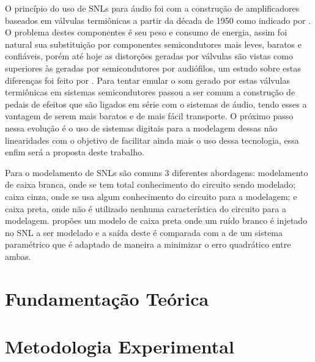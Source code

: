 O princípio do uso de SNLs para áudio foi com a construção de amplificadores baseados em válvulas termiônicas a partir da década de 1950 como indicado por . O problema destes componentes é seu peso e consumo de energia, assim foi natural sua substituição por componentes semicondutores mais leves, baratos e confiáveis, porém até hoje as distorções geradas por válvulas são vistas como superiores às geradas por semicondutores por audiófilos, um estudo sobre estas diferenças foi feito por . Para tentar emular o som gerado por estas válvulas termiônicas em sistemas semicondutores passou a ser comum a construção de pedais de efeitos que são ligados em série com o sistemas de áudio, tendo esses a vantagem de serem mais baratos e de mais fácil transporte. O próximo passo nessa evolução é o uso de sistemas digitais para a modelagem dessas não linearidades com o objetivo de facilitar ainda mais o uso dessa tecnologia, essa enfim será a proposta deste trabalho.

Para o modelamento de SNLs são comuns 3 diferentes abordagens: modelamento de caixa branca, onde se tem total conhecimento do circuito sendo modelado; caixa cinza, onde se usa algum conhecimento do circuito para a modelagem; e caixa preta, onde não é utilizado nenhuma característica do circuito para a modelagem.  propões um modelo de caixa preta onde um ruído branco é injetado no SNL a ser modelado e a saída deste é comparada com a de um sistema paramétrico que é adaptado de maneira a minimizar o erro quadrático entre ambas. 

	\chapter{Fundamentação Teórica}



	\chapter{Metodologia Experimental}

